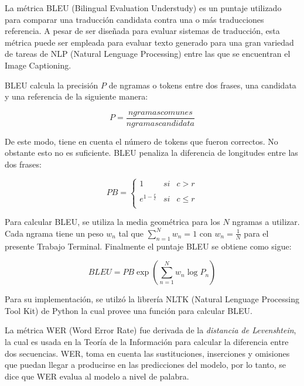 La métrica BLEU (Bilingual Evaluation Understudy) es un puntaje utilizado para comparar una traducción candidata contra una o más traducciones referencia. A pesar de ser diseñada para evaluar sistemas de traducción, esta métrica puede ser empleada para evaluar texto generado para una gran variedad de tareas de NLP (Natural Lenguage Processing) entre las que se encuentran el Image Captioning. 

BLEU calcula la precisión $P$ de ngramas o tokens entre dos frases, una candidata y una referencia de la siguiente manera:

\begin{equation}
    P = \frac{ngramas comunes}{ngramas candidata}
\end{equation}

\vspace{1em}

De este modo, tiene en cuenta el número de tokens que fueron correctos. No obstante esto no es suficiente. BLEU penaliza la diferencia de longitudes entre las dos frases:

\begin{equation}
    PB = \left\{ \begin{array}{lcc}
        1 &   si  & c > r \\
        \\ e ^ {1-\frac{r}{c}} &  si & c \leq r \\
        \end{array}
    \right.
\end{equation}

Para calcular BLEU, se utiliza la media geométrica para los $N$ ngramas a utilizar. Cada ngrama tiene un peso $w_{n}$ tal que $\sum_{n = 1}^{N} w_{n} = 1$ con $w_{n} = \frac{1}{N}$ para el presente Trabajo Terminal. Finalmente el puntaje BLEU se obtiene como sigue:

\begin{equation}
    BLEU = PB \exp \left(\sum_{n = 1}^{N}w_{n} \log P_{n} \right)
\end{equation}

\vspace{1em}

Para su implementación, se utilzó la librería NLTK (Natural Lenguage Processing Tool Kit) de Python la cual provee una función para calcular BLEU.

La métrica WER (Word Error Rate) fue derivada de la \textit{distancia de Levenshtein}, la cual es usada en la Teoría de la Información para calcular la diferencia entre dos secuencias. WER, toma en cuenta las sustituciones, inserciones y omisiones que puedan llegar a producirse en las predicciones del modelo, por lo tanto, se dice que WER evalua al modelo a nivel de palabra. 

